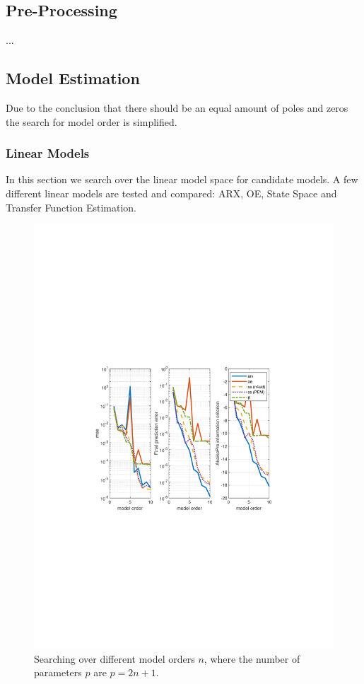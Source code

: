 \documentclass[]{article}
\begin{document}
\subsection{Pre-Processing}
...

\subsection{Model Estimation}
Due to the conclusion that there should be an equal amount of poles and zeros the search for model order is simplified.
\subsubsection{Linear Models}
 In this section we search over the linear model space for candidate models. A few different linear models are tested and compared: ARX, OE, State Space and Transfer Function Estimation. 

\begin{figure}[ht]
\centering
\includegraphics[trim= 10cm 8cm 10cm 8cm, scale=0.7]{figures/model_order.pdf}
\caption{Searching over different model orders $n$, where the number of parameters $p$ are $p=2n+1$.}
\label{fig:model_order}
\end{figure}
\end{document}
